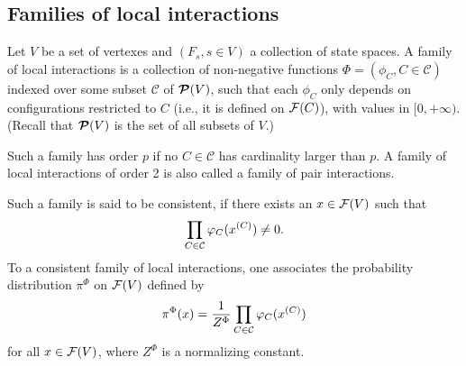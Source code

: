 \subsection{Families of local interactions}
\begin{definition}
\label{def:set.int} 
Let $V$ be a set of vertexes and $(F_s, s\in V)$ a collection
of state spaces.  A family of local interactions is a collection of
non-negative functions $\Phi = (\phi_C, C\in \mathcal C)$ indexed over some subset
$\mathcal C$ of ${\bm{\mathcal P}({V})}$, such that each $\phi_C$ only depends on configurations restricted to $C$ (i.e., it is defined on ${\mathcal F}(C)$), with values in $[0, +\infty)$.  (Recall that ${\bm{\mathcal P}({V})}$ is the set of all subsets of $V$.)

Such a family has order $p$ if no $C\in\mathcal C$ has cardinality larger
than $p$. A family of local interactions of order 2 is also called a
family of pair interactions.

Such a family is said to be consistent, if there exists an $x\in {\mathcal F}(V)$
such that
\[
\prod_{C\in \mathcal C} \varphi_C(x^{(C)}) \neq 0.
\]
To a consistent family of local interactions, one associates the
probability distribution $\pi^{\Phi}$ on ${\mathcal F}(V)$  defined by
\begin{equation}
\label{eq:pi.phi}
\pi^\Phi(x) = \frac1{Z^\Phi} \prod_{C\in \mathcal C} \varphi_C(x^{(C)}) 
\end{equation}
for all $x\in {\mathcal F}(V)$, where $Z^\Phi$ is a normalizing constant.
\end{definition}


